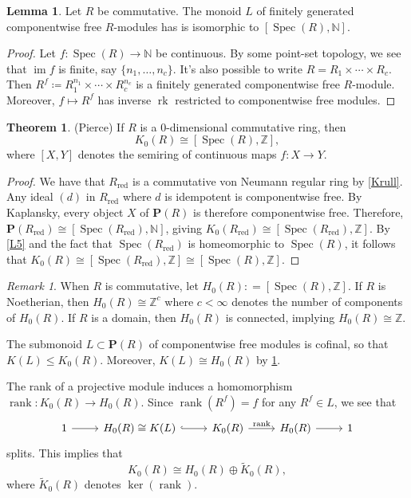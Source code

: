 \documentclass[10pt,letterpaper,cm]{nupset}
\theoremstyle{definition}
\theoremstyle{theorem}
\newtheorem{theorem}[definition]{Theorem}
\newtheorem{lemma}[definition]{Lemma}
\theoremstyle{remark}
\newtheorem{remark}[definition]{Remark}
\newcommand{\N}{\mathbb N}
\renewcommand{\P}{\mathbf P}
\newcommand{\Z}{\mathbb Z}
\newcommand{\1}{\mathbf{1}}
\newcommand{\0}{\vec 0}
\DeclareMathOperator{\im}{im}
\DeclareMathOperator{\red}{red}
\DeclareMathOperator{\spec}{Spec}
\DeclareMathOperator{\rank}{rank}
\DeclareMathOperator{\rk}{rk}
\begin{document}
\begin{lemma}\label{L6}
Let $R$ be commutative. The monoid $L$ of finitely generated componentwise free $R$-modules has is isomorphic to $[\spec(R), \N]$.
\end{lemma}
\begin{proof}
Let $f: \spec(R) \to \N$ be continuous. By some point-set topology, we see that $\im f$ is finite, say $\{n_1, \ldots, n_c\}$. It's also possible to write $R= R_1 \times \cdots \times R_c$. Then $R^f \coloneqq R_1^{n_1} \times \cdots \times R_c^{n_c}$ is a finitely generated componentwise free $R$-module. Moreover, $f \mapsto R^f$ has inverse $\rk$ restricted to componentwise free modules.
\end{proof}


\begin{theorem}{(Pierce)}
If $R$ is a $0$-dimensional commutative ring, then $$K_0(R) \cong [\spec(R), \Z],$$ where $[X, Y]$ denotes the semiring of continuous maps $f: X\to Y$.
\end{theorem}
\begin{proof}
We have that $R_{\red}$ is a commutative von Neumann regular ring by \cref{Krull}. Any ideal $(d)$ in $R_{\red}$  where $d$ is idempotent is componentwise free. By Kaplansky, every object $X$ of $\P(R)$ is therefore componentwise free. Therefore, $\P(R_{\red}) \cong [\spec(R_{\red}), \N]$, giving $K_0(R_{\red}) \cong [\spec(R_{\red}), \Z]$. By \cref{L5} and the fact that $\spec(R_{\red})$ is homeomorphic to $\spec(R)$, it follows that $K_0(R)\cong [\spec(R_{\red}), \Z] \cong [\spec(R), \Z]$.
\end{proof}

\begin{remark}
When $R$ is commutative, let $H_0(R): = [\spec(R), \Z]$. If $R$ is Noetherian, then $H_0(R) \cong \Z^c$ where $c <\infty$ denotes the number of components of $H_0(R)$. If $R$ is a domain, then $H_0(R)$ is connected, implying $H_0(R) \cong \Z$.

The submonoid $L\subset \P(R)$ of componentwise free modules is cofinal, so that $K(L) \leq K_0(R)$. Moreover, $K(L) \cong H_0(R)$ by \cref{L6}.

The rank of a projective module induces a homomorphism $\rank: K_0(R) \to H_0(R)$. Since $\rank(R^f) = f$ for any $R^f \in L$, we see that
\[
\begin{tikzcd}
1 \arrow[r] & H_0(R) \cong K(L) \arrow[r, hook] & K_0(R) \arrow[r, "\rank"] & H_0(R) \arrow[r] & 1
\end{tikzcd}
\]
splits. This implies that $$K_0(R) \cong H_0(R) \oplus \widetilde{K}_0(R),$$ where $\widetilde{K}_0(R)$ denotes $\ker(\rank)$.
\end{remark}
\end{document}
